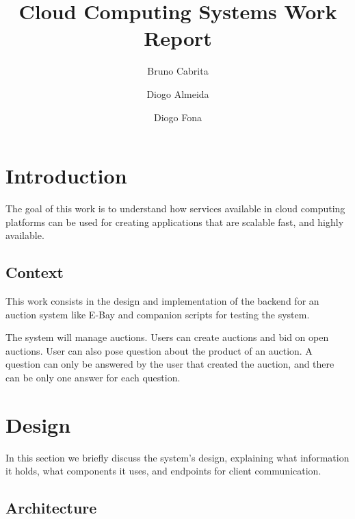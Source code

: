\documentclass[runningheads]{llncs}
\begin{document}
%
\title{Cloud Computing Systems Work Report}
%
%
\author{Bruno Cabrita \and
Diogo Almeida \and
Diogo Fona}
%
%
%
\maketitle %
%
%
\section{Introduction}
The goal of this work is to understand how services available in cloud computing platforms can be used for creating applications that are scalable fast, and highly available.

\subsection{Context}
This work consists in the design and implementation of the backend for an auction system like E-Bay and companion scripts for testing the system.

The system will manage auctions. Users can create auctions and bid on open auctions. User can also pose question about the product of an auction. A question can only be answered by the user that created the auction, and there can be only one answer for each question.


\section{Design}

In this section we briefly discuss the system's design, explaining what information it holds, what components it uses, and endpoints for client communication.

\subsection{Architecture}
\end{document}
